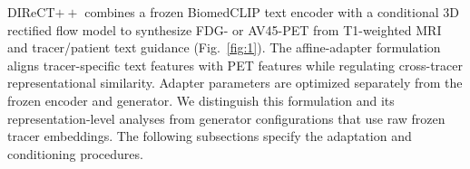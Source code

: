 DIReCT$++$ combines a frozen BiomedCLIP text encoder with a conditional 3D rectified flow model to synthesize FDG- or AV45-PET from T1-weighted MRI and tracer/patient text guidance (Fig.~\ref{fig:1}). The affine-adapter formulation aligns tracer-specific text features with PET features while regulating cross-tracer representational similarity. Adapter parameters are optimized separately from the frozen encoder and generator. We distinguish this formulation and its representation-level analyses from generator configurations that use raw frozen tracer embeddings. The following subsections specify the adaptation and conditioning procedures.
